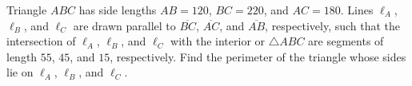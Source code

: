 Triangle $ABC$ has side lengths $AB=120$, $BC=220$, and $AC=180$. Lines $\ell_{A}$, $\ell_{B}$, and $\ell_{C}$ are drawn parallel to $\overline{BC}$, $\overline{AC}$, and $\overline{AB}$, respectively, such that the intersection of $\ell_{A}$, $\ell_{B}$, and $\ell_{C}$ with the interior or $\triangle ABC$ are segments of length $55$, $45$, and $15$, respectively. Find the perimeter of the triangle whose sides lie on $\ell_{A}$, $\ell_{B}$, and $\ell_{C}$.